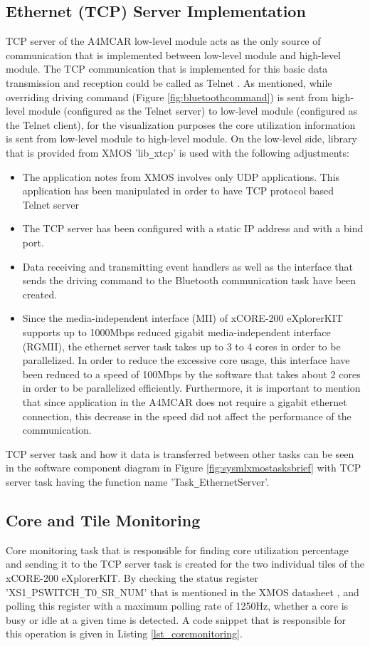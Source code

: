 \subsection{Ethernet (TCP) Server Implementation}
TCP server of the A4MCAR low-level module acts as the only source of communication that is implemented between low-level module and high-level module. The TCP communication that is implemented for this basic data transmission and reception could be called as Telnet \cite{telnet}. As mentioned, while overriding driving command (Figure \ref{fig:bluetoothcommand}) is sent from high-level module (configured as the Telnet server) to low-level module (configured as the Telnet client), for the visualization purposes the core utilization information is sent from low-level module to high-level module. On the low-level side, library that is provided from XMOS 'lib\texttt{\_}xtcp' is used with the following adjustments:
\begin{itemize}
	\item The application notes from XMOS involves only UDP applications. This application has been manipulated in order to have TCP protocol based Telnet server
	\item The TCP server has been configured with a static IP address and with a bind port.
	\item Data receiving and transmitting event handlers as well as the interface that sends the driving command to the Bluetooth communication task have been created.
	\item Since the media-independent interface (MII) of xCORE-200 eXplorerKIT supports up to 1000Mbps reduced gigabit media-independent interface (RGMII), the ethernet server task takes up to 3 to 4 cores in order to be parallelized. In order to reduce the excessive core usage, this interface have been reduced to a speed of 100Mbps by the software that takes about 2 cores in order to be parallelized efficiently. Furthermore, it is important to mention that since application in the A4MCAR does not require a gigabit ethernet connection, this decrease in the speed did not affect the performance of the communication.
\end{itemize}

TCP server task and how it data is transferred between other tasks can be seen in the software component diagram in Figure \ref{fig:sysmlxmostasksbrief} with TCP server task having the function name 'Task\texttt{\_}EthernetServer'.

\subsection{Core and Tile Monitoring}
Core monitoring task that is responsible for finding core utilization percentage and sending it to the TCP server task is created for the two individual tiles of the xCORE-200 eXplorerKIT. By checking the status register 'XS1\texttt{\_}PSWITCH\texttt{\_}T0\texttt{\_}SR\texttt{\_}NUM' that is mentioned in the XMOS datasheet \cite{xmosdatasheet}, and polling this register with a maximum polling rate of 1250Hz, whether a core is busy or idle at a given time is detected. A code snippet that is responsible for this operation is given in Listing \ref{lst_coremonitoring}. 


